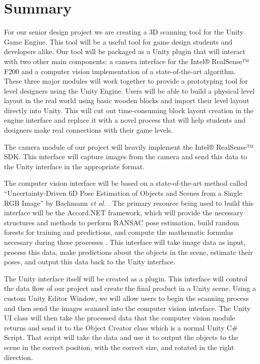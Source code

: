 \documentclass[12pt]{article}
\begin{document}
\section{Summary}\label{summary}

For our senior design project we are creating a 3D scanning tool for the
Unity Game Engine. This tool will be a useful tool for game design
students and developers alike. Our tool will be packaged as a Unity
plugin that will interact with two other main components: a camera
interface for the Intel® RealSense™ F200 and a computer vision
implementation of a state-of-the-art algorithm. These three major
modules will work together to provide a prototyping tool for level
designers using the Unity Engine. Users will be able to build a physical
level layout in the real world using basic wooden blocks and import
their level layout directly into Unity. This will cut out time-consuming
block layout creation in the engine interface and replace it with a
novel process that will help students and designers make real
connections with their game levels.

The camera module of our project will heavily implement the Intel®
RealSense™ SDK. This interface will capture images from the camera and
send this data to the Unity interface in the appropriate format.

The computer vision interface will be based on a state-of-the-art method
called ``Uncertainty-Driven 6D Pose Estimation of Objects and Scenes
from a Single RGB Image'' by Bachmann \emph{et al.} \autocite{bachmann}.
The primary resource being used to build this interface will be the
Accord.NET framework, which will provide the necessary structures and
methods to perform RANSAC pose estimation, build random forests for
training and predictions, and compute the mathematic formulas necessary
during these processes \autocite{accord}. This interface will take image
data as input, process this data, make predictions about the objects in
the scene, estimate their poses, and output this data back to the Unity
interface.

The Unity interface itself will be created as a plugin. This interface
will control the data flow of our project and create the final product
in a Unity scene. Using a custom Unity Editor Window, we will allow
users to begin the scanning process and then send the images scanned
into the computer vision interface. The Unity UI class will then take
the processed data that the computer vision module returns and send it
to the Object Creator class which is a normal Unity C\# Script. That
script will take the data and use it to output the objects to the scene
in the correct position, with the correct size, and rotated in the right
direction.
\end{document}
